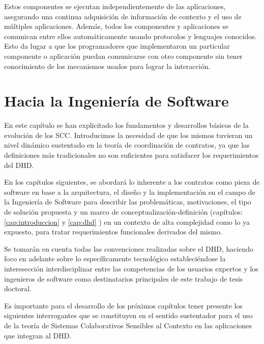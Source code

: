 Estos componentes se ejecutan independientemente de las aplicaciones, asegurando
una
continua adquisición de información de contexto y el uso de múltiples
aplicaciones.
Además, todos los componentes y aplicaciones se comunican entre ellos
automáticamente usando protocolos y lenguajes conocidos. Esto da lugar a que los
programadores que implementaron un particular componente o aplicación puedan
comunicarse con otro componente sin tener conocimiento de los mecanismos usados
para lograr la interacción.

\section{Hacia la Ingeniería de Software}
 
En este capítulo se han explicitado los fundamentos y desarrollos básicos de la evolución
de los
SCC. Introducimos la necesidad de que
los mismos tuvieran un nivel dinámico sustentado en la teoría de coordinación de
contratos, ya que las definiciones más tradicionales no son suficientes para
satisfacer los
requerimientos del DHD.

En los capítulos siguientes, se abordará lo inherente a los
contratos
como pieza de software en base a la arquitectura, el dise\~no y la
implementación en el campo de la Ingeniería de Software para describir las problemáticas, motivaciones,
el tipo de solución propuesta y un marco de conceptualización-definición
(capítulos: \ref{cap:introduccion} y \ref{cap:dhd} ) en un contexto de alta
complejidad como lo ya expuesto, para tratar requerimientos funcionales derivados del mismo. 

Se tomarán en cuenta todas las convenciones realizadas sobre el
DHD, haciendo foco en adelante sobre lo específicamente tecnológico estableciéndose la interesección interdisciplinar entre las competencias de los usuarios expertos y los ingenieros de software como destinatarios principales de este trabajo de tesis doctoral. 

Es importante para el desarrollo de los próximos capítulos tener presente los
siguientes interrogantes que se constituyen en el sentido sustentador para el
uso de la teoría de Sistemas Colaborativos Sensibles al Contexto en las
aplicaciones que integran al DHD. 


